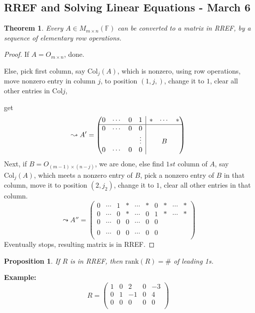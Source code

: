 \documentclass[12pt]{article}
\newtheorem{theorem}{Theorem}[subsection]
\newtheorem{proposition}{Proposition}[subsection]
\newcommand{\rank}{\mathrm{rank}}
\newcommand{\Col}{\mathrm{Col}}
\newcommand{\mF}{{\mathbb{F}}}
\newcommand{\rvline}{\hspace*{-\arraycolsep}\vline\hspace*{-\arraycolsep}}
\begin{document}
\subsection{RREF and Solving Linear Equations - March 6}
\begin{theorem}
	Every $A \in M_{m\times n}(\mF)$ can be converted to a matrix in RREF,
	by a sequence of elementary row operations. 
\end{theorem}
\begin{proof}
	If $A = O_{m\times n}$, done. 

	Else, pick first column, say $\Col_j(A)$, which is nonzero, using row 
	operations, move nonzero entry in column $j$, to position $(1, j,)$, change
	it to $1$, clear all other entries in $\Col j$, 

	get 
	\[
		\leadsto A' = 
		\begin{pmatrix}
			0 & \cdots & 0	& 1		& \rvline	& *	& \cdots & *	\\	\hline
			0 & \cdots & 0	& 0		& \rvline	&  	&  & 	\\
			  &		   &	& \vdots& \rvline	&	&   B    &		\\
			0 & \cdots & 0	& 0		& \rvline	& 	&   & 	\\
		\end{pmatrix}
	\]
	Next, if $B = O_{(m-1)\times (n-j)}$, we are done, else
	find $1st$ column of $A$, say $\Col_j(A)$, which meets a nonzero entry of 
	$B$, pick a nonzero entry of $B$ in that column, move it to position 
	$(2, j_2)$, change it to $1$, clear all other entries in that column. 
	\[
		\leadsto A'' = 
		\begin{pmatrix}
			0 & \cdots  & 1 & * & \cdots & * & 0 & * & \cdots & * \\ \hline
			0 & \cdots  & 0 & * & \cdots & 0 & 1 & * & \cdots & * \\ \hline
			0 & \cdots  & 0 & 0 & \cdots & 0 & 0 & 	&  	& 	\\
			  &		    &   &   &	    &   &	&   &	&	\\
			0 & \cdots  & 0 & 0 & \cdots & 0 & 0 &   & 	&	\\
		\end{pmatrix}
	\]
	Eventually stops, resulting matrix is in RREF.
\end{proof}

\begin{proposition}
	If $R$ is in RREF, then $\rank(R) = \#$ of leading 1s. 
\end{proposition}

\textbf{Example: }
\[
	R = 
	\begin{pmatrix}
		1 & 0 & 2 & 0 & -3	\\
		0 & 1 & -1 & 0 & 4	\\
		0 & 0 & 0 & 0 & 0	\\
	\end{pmatrix}
\]
\end{document}
